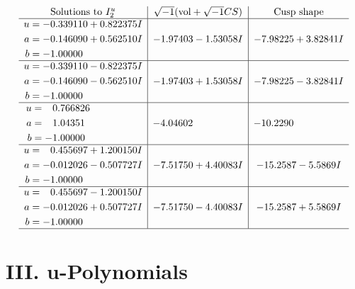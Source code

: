 \documentclass[1p]{elsarticle_modified}
\theoremstyle{definition}
\newcommand{\I}{\sqrt{-1}}
\begin{document}
$$\begin{array}{c|c|c}  
\text{Solutions to }I^u_{2}& \I (\text{vol} + \sqrt{-1}CS) & \text{Cusp shape}\\
 \hline 
\begin{aligned}
u &= -0.339110 + 0.822375 I \\
a &= -0.146090 + 0.562510 I \\
b &= -1.00000\phantom{ +0.000000I}\end{aligned}
 & -1.97403 - 1.53058 I & -7.98225 + 3.82841 I \\ \hline\begin{aligned}
u &= -0.339110 - 0.822375 I \\
a &= -0.146090 - 0.562510 I \\
b &= -1.00000\phantom{ +0.000000I}\end{aligned}
 & -1.97403 + 1.53058 I & -7.98225 - 3.82841 I \\ \hline\begin{aligned}
u &= \phantom{-}0.766826\phantom{ +0.000000I} \\
a &= \phantom{-}1.04351\phantom{ +0.000000I} \\
b &= -1.00000\phantom{ +0.000000I}\end{aligned}
 & -4.04602\phantom{ +0.000000I} & -10.2290\phantom{ +0.000000I} \\ \hline\begin{aligned}
u &= \phantom{-}0.455697 + 1.200150 I \\
a &= -0.012026 - 0.507727 I \\
b &= -1.00000\phantom{ +0.000000I}\end{aligned}
 & -7.51750 + 4.40083 I & -15.2587 - 5.5869 I \\ \hline\begin{aligned}
u &= \phantom{-}0.455697 - 1.200150 I \\
a &= -0.012026 + 0.507727 I \\
b &= -1.00000\phantom{ +0.000000I}\end{aligned}
 & -7.51750 - 4.40083 I & -15.2587 + 5.5869 I\\
 \hline 
 \end{array}$$\newpage
\newpage\renewcommand{\arraystretch}{1}
\centering \section*{ III. u-Polynomials}
\end{document}
